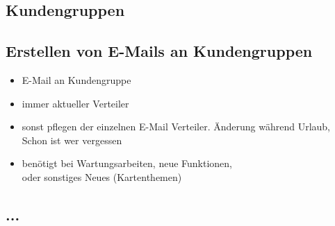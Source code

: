 \subsection{Kundengruppen}
\subsection{Erstellen von E-Mails an Kundengruppen}
\begin{itemize}
	\item E-Mail an Kundengruppe
	\item immer aktueller Verteiler
	\item sonst pflegen der einzelnen E-Mail Verteiler. Änderung während Urlaub, Schon ist wer vergessen
	\item benötigt bei Wartungsarbeiten, neue Funktionen,\\ oder sonstiges Neues (Kartenthemen)
\end{itemize}
\subsection{...}

